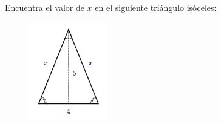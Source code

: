 Encuentra el valor de $x$ en el siguiente triángulo isóceles:
\begin{figure}[H]
    \begin{center}
        \includegraphics[width=0.3\textwidth]{../images/pitagoras8.png}
    \end{center}
    \caption{}
    \label{fig:pitagoras8}
\end{figure}
